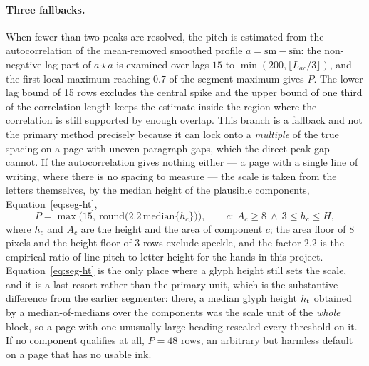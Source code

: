 \paragraph{Three fallbacks.}
When fewer than two peaks are resolved, the pitch is estimated from the autocorrelation of the mean-removed smoothed profile $a=\mathrm{sm}-\overline{\mathrm{sm}}$: the non-negative-lag part of $a\star a$ is examined over lags $15$ to $\min(200,\lfloor L_{ac}/3\rfloor)$, and the first local maximum reaching $0.7$ of the segment maximum gives $P$.
The lower lag bound of 15 rows excludes the central spike and the upper bound of one third of the correlation length keeps the estimate inside the region where the correlation is still supported by enough overlap.
This branch is a fallback and not the primary method precisely because it can lock onto a \emph{multiple} of the true spacing on a page with uneven paragraph gaps, which the direct peak gap cannot.
If the autocorrelation gives nothing either --- a page with a single line of writing, where there is no spacing to measure --- the scale is taken from the letters themselves, by the median height of the plausible components, Equation~\ref{eq:seg-ht},
\begin{equation}
P=\max\bigl(15,\ \mathrm{round}\bigl(2.2\,\mathrm{median}\{h_c\}\bigr)\bigr),\qquad c:\ A_c\ge8\ \wedge\ 3\le h_c\le H,
\label{eq:seg-ht}
\end{equation}
where $h_c$ and $A_c$ are the height and the area of component $c$; the area floor of 8 pixels and the height floor of 3 rows exclude speckle, and the factor $2.2$ is the empirical ratio of line pitch to letter height for the hands in this project.
Equation~\ref{eq:seg-ht} is the only place where a glyph height still sets the scale, and it is a last resort rather than the primary unit, which is the substantive difference from the earlier segmenter: there, a median glyph height $h_{\mathrm{t}}$ obtained by a median-of-medians over the components was the scale unit of the \emph{whole} block, so a page with one unusually large heading rescaled every threshold on it.
If no component qualifies at all, $P=48$ rows, an arbitrary but harmless default on a page that has no usable ink.

